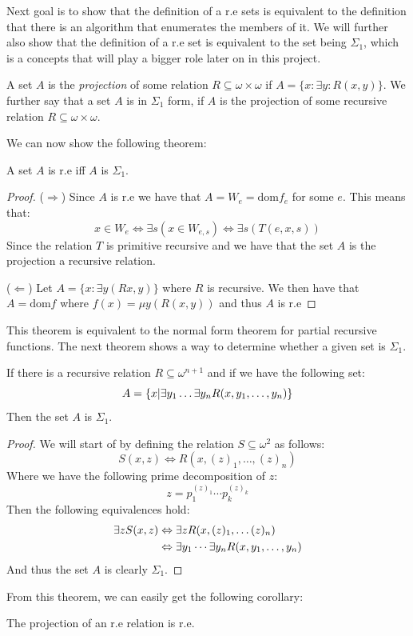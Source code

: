 \documentclass[../main.tex]{subfiles}
\begin{document}
Next goal is to show that the definition of a r.e sets is equivalent to the
definition that there is an algorithm that enumerates the members of it. We
will further also show that the definition of a r.e set is equivalent to the
set being $\Sigma_1$, which is a concepts that will play a bigger role later on
in this project.
\begin{defi}
	A set $A$ is the \textit{projection} of some relation $R\subseteq
	\omega\times\omega$ if $A=\{x:\exists y: R(x,y)\}$. We further say that
	a set $A$ is in $\Sigma_1$ form, if $A$ is the projection of some
	recursive relation $R\subseteq\omega\times\omega$.
\end{defi}
We can now show the following theorem:
\begin{thm}
	A set $A$ is r.e iff $A$ is $\Sigma_1$.
\end{thm}
\begin{proof}
	($\Rightarrow$) Since $A$ is r.e we have that $A=W_e=\text{dom} f_e$
	for some $e$. This means that:
	$$x\in W_e\Leftrightarrow\exists s(x\in W_{e,s})\Leftrightarrow \exists
	s(T(e,x,s))$$
	Since the relation $T$ is primitive recursive and we have that the set $A$
	is the projection a recursive relation.

	($\Leftarrow$) Let $A=\{x:\exists y(Rx,y)\}$ where $R$ is recursive. We
	then have that $A=\text{dom} f$ where $f(x)=\mu y(R(x,y))$ and thus $A$
	is r.e
\end{proof}
This theorem is equivalent to the normal form theorem for partial recursive
functions. The next theorem shows a way to determine whether a given set is
$\Sigma_1$.
\begin{thm}
	\label{thm:RecSigma}
	If there is a recursive relation $R\subseteq\omega^{n+1}$ and if we
	have the following set:
	$$A=\{x|\exists y_1\ldots\exists  y_n R(x,y_1,\ldots,y_n)\}$$
	Then the set $A$ is $\Sigma_1$.
\end{thm}
\begin{proof}
	We will start of by defining the relation $S\subseteq\omega^2$ as
	follows:
	$$S(x,z)\Leftrightarrow R(x,(z)_1,\ldots,(z)_n)$$
	Where we have the following prime decomposition of $z$:
	$$z=p_1^{(z)_1}\cdots p_k^{(z)_k}$$
	Then the following equivalences hold:
	\begin{align*}
		\exists zS(x,z)&\Leftrightarrow \exists z R(x,(z)_1,\ldots
		(z)_n)\\
			       &\Leftrightarrow \exists y_1\cdots \exists y_n
			       R(x,y_1,\ldots,y_n)
	\end{align*}
	And thus the set $A$ is clearly $\Sigma_1$.
\end{proof}
From this theorem, we can easily get the following corollary:
\begin{cor}
	The projection of an r.e relation is r.e.
\end{cor}
\end{document}
